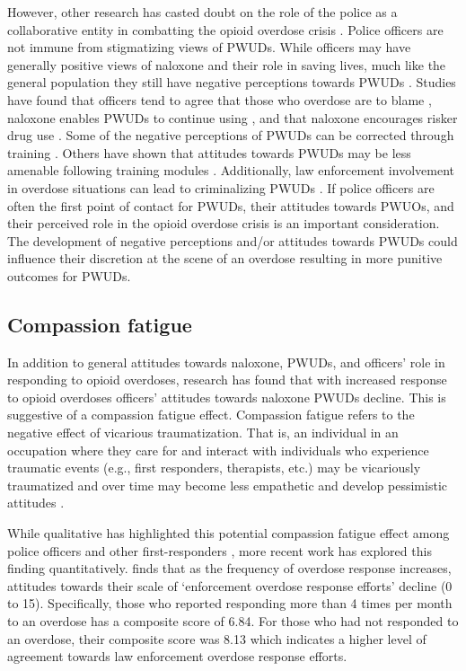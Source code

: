 However, other research has casted doubt on the role of the police as a collaborative entity in combatting the opioid overdose crisis \parencite{carroll_police_2023}. Police officers are not immune from stigmatizing views of PWUDs. While officers may have generally positive views of naloxone and their role in saving lives, much like the general population they still have negative perceptions towards PWUDs \parencite{barry_stigma_2014, calabrese_opposition_2019}. Studies have found that officers tend to agree that those who overdose are to blame \parencite{beletsky_attitudes_2005, wagner_training_2016}, naloxone enables PWUDs to continue using \parencite{banta-green_police_2013, burris_stopping_2009}, and that naloxone encourages risker drug use \parencite{saunders_you_2019}. Some of the negative perceptions of PWUDs can be corrected through training \parencite{winograd_concerns_2019}. Others have shown that attitudes towards PWUDs may be less amenable following training modules \parencite{wagner_training_2016}. Additionally, law enforcement involvement in overdose situations can lead to criminalizing PWUDs \parencite{lowder_twoyear_2020, van_der_meulen_thats_2021}. If police officers are often the first point of contact for PWUDs, their attitudes towards PWUOs, and their perceived role in the opioid overdose crisis is an important consideration. The development of negative perceptions and/or attitudes towards PWUDs could influence their discretion at the scene of an overdose resulting in more punitive outcomes for PWUDs.

\subsection{Compassion fatigue}

In addition to general attitudes towards naloxone, PWUDs, and officers’ role in responding to opioid overdoses, research has found that with increased response to opioid overdoses officers’ attitudes towards naloxone PWUDs decline. This is suggestive of a compassion fatigue effect. Compassion fatigue refers to the negative effect of vicarious traumatization. That is, an individual in an occupation where they care for and interact with individuals who experience traumatic events (e.g., first responders, therapists, etc.) may be vicariously traumatized and over time may become less empathetic and develop pessimistic attitudes \parencite{adams_compassion_2006, figley_compassion_1995}.

While qualitative has highlighted this potential compassion fatigue effect among police officers and other first-responders \parencite{banta-green_police_2013, saunders_you_2019}, more recent work has explored this finding quantitatively. \textcite{carroll_knowledge_2020} finds that as the frequency of overdose response increases, attitudes towards their scale of ‘enforcement overdose response efforts’ decline (0 to 15). Specifically, those who reported responding more than 4 times per month to an overdose has a composite score of 6.84. For those who had not responded to an overdose, their composite score was 8.13 which indicates a higher level of agreement towards law enforcement overdose response efforts. 

